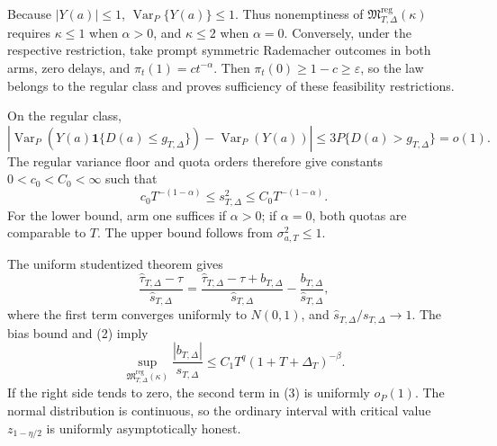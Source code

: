 Because \(|Y(a)|\leq1\), \(\operatorname{Var}_P\{Y(a)\}\leq1\).  Thus nonemptiness of \(\mathfrak M_{T,\Delta}^{\mathrm{reg}}(\kappa)\) requires \(\kappa\leq1\) when \(\alpha>0\), and \(\kappa\leq2\) when \(\alpha=0\).  Conversely, under the respective restriction, take prompt symmetric Rademacher outcomes in both arms, zero delays, and \(\pi_t(1)=ct^{-\alpha}\).  Then \(\pi_t(0)\geq1-c\geq\varepsilon\), so the law belongs to the regular class and proves sufficiency of these feasibility restrictions.

On the regular class,
\[
 |\operatorname{Var}_P(Y(a)\mathbf 1\{D(a)\leq g_{T,\Delta}\})
 -\operatorname{Var}_P(Y(a))|
 \leq3P\{D(a)>g_{T,\Delta}\}=o(1). \tag{1}
\]
The regular variance floor and quota orders therefore give constants \(0<c_0<C_0<\infty\) such that
\[
 c_0T^{-(1-\alpha)}\leq s_{T,\Delta}^2
 \leq C_0T^{-(1-\alpha)}. \tag{2}
\]
For the lower bound, arm one suffices if \(\alpha>0\); if \(\alpha=0\), both quotas are comparable to \(T\).  The upper bound follows from \(\sigma_{a,T}^2\leq1\).

The uniform studentized theorem gives
\[
 \frac{\widehat\tau_{T,\Delta}-\tau}{\widehat s_{T,\Delta}}
 =\frac{\widehat\tau_{T,\Delta}-\tau+b_{T,\Delta}}
 {\widehat s_{T,\Delta}}
 -\frac{b_{T,\Delta}}{\widehat s_{T,\Delta}}, \tag{3}
\]
where the first term converges uniformly to \(N(0,1)\), and \(\widehat s_{T,\Delta}/s_{T,\Delta}\to1\).  The bias bound and (2) imply
\[
 \sup_{\mathfrak M_{T,\Delta}^{\mathrm{reg}}(\kappa)}
 \frac{|b_{T,\Delta}|}{s_{T,\Delta}}
 \leq C_1T^q(1+T+\Delta_T)^{-\beta}. \tag{4}
\]
If the right side tends to zero, the second term in (3) is uniformly \(o_P(1)\).  The normal distribution is continuous, so the ordinary interval with critical value \(z_{1-\eta/2}\) is uniformly asymptotically honest.

